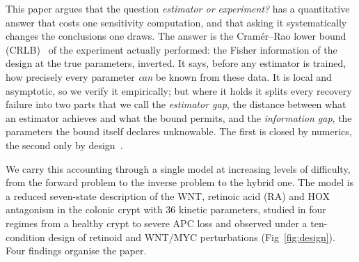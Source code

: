This paper argues that the question \emph{estimator or experiment?} has a
quantitative answer that costs one sensitivity computation, and that asking it systematically
changes the conclusions one draws. The answer is the Cram\'er--Rao lower bound
(CRLB)~\citep{rao1945information,cramer1946mathematical} of the experiment
actually performed: the Fisher information of the design at the true parameters,
inverted. It says, before any estimator is trained, how precisely every
parameter \emph{can} be known from these data. It is local and asymptotic, so we
verify it empirically; but where it holds it splits every recovery failure into
two parts that we call the \emph{estimator gap}, the distance between what an
estimator achieves and what the bound permits, and the \emph{information gap},
the parameters the bound itself declares unknowable. The first is closed by
numerics, the second only by design~\citep{kreutz2009design,bandara2009oed,apgar2010sloppy}.

We carry this accounting through a single model at increasing levels of
difficulty, from the forward problem to the inverse problem to the hybrid one.
The model is a reduced seven-state description of the WNT, retinoic acid (RA)
and HOX antagonism in the colonic crypt with 36 kinetic parameters, studied in
four regimes from a healthy crypt to severe APC loss and observed under a
ten-condition design of retinoid and WNT/MYC perturbations (Fig~\ref{fig:design}).
Four findings organise the paper.

